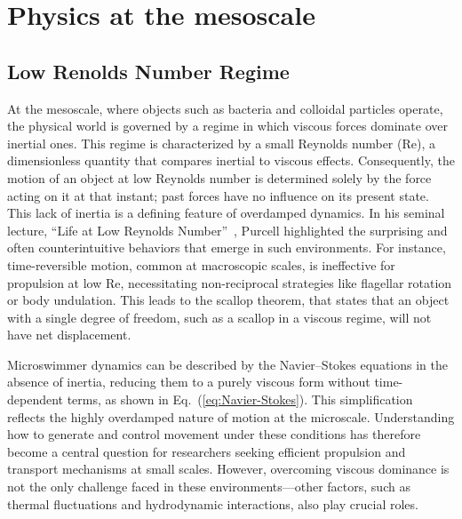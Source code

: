 \chapter{Physics at the mesoscale}
\label{ch:swimming at the mesoscale}


\section{Low Renolds Number Regime}
\label{st:lowreynoldsnumber}

At the mesoscale, where objects such as bacteria and colloidal particles operate, the physical world is governed by a regime in which viscous forces dominate over inertial ones. This regime is characterized by a small Reynolds number (Re), a dimensionless quantity that compares inertial to viscous effects. Consequently, the motion of an object at low Reynolds number is determined solely by the force acting on it at that instant; past forces have no influence on its present state. This lack of inertia is a defining feature of overdamped dynamics. In his seminal lecture, ``Life at Low Reynolds Number''~\cite{purcell2014life}, Purcell highlighted the surprising and often counterintuitive behaviors that emerge in such environments. For instance, time-reversible motion, common at macroscopic scales, is ineffective for propulsion at low Re, necessitating non-reciprocal strategies like flagellar rotation or body undulation. This leads to the scallop theorem, that states that an object with a single degree of freedom, such as a scallop in a viscous regime, will not have net displacement. 

Microswimmer dynamics can be described by the Navier–Stokes equations in the absence of inertia, reducing them to a purely viscous form without time-dependent terms, as shown in Eq.~(\ref{eq:Navier-Stokes}). This simplification reflects the highly overdamped nature of motion at the microscale. Understanding how to generate and control movement under these conditions has therefore become a central question for researchers seeking efficient propulsion and transport mechanisms at small scales. However, overcoming viscous dominance is not the only challenge faced in these environments—other factors, such as thermal fluctuations and hydrodynamic interactions, also play crucial roles.


